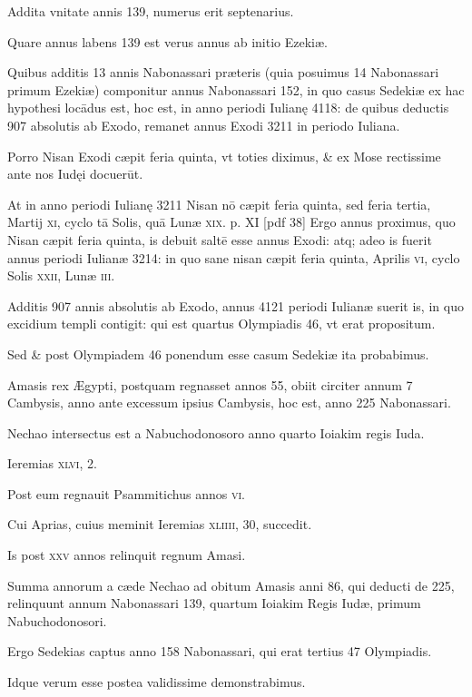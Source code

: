 \begin{parnumbers}
Addita vnitate annis 139, numerus erit septenarius. 

Quare annus labens 139 est verus annus ab initio Ezekiæ.

Quibus additis 13 annis Nabonassari præteris (quia posuimus 14 Nabonassari primum Ezekiæ) componitur annus Nabonassari 152, in quo casus Sedekiæ ex hac hypothesi locādus est, hoc est, in anno periodi Iulianę 4118: de quibus deductis 907 absolutis ab Exodo, remanet annus Exodi 3211 in periodo Iuliana.

Porro Nisan Exodi cæpit feria quinta, vt toties diximus, \& ex Mose rectissime ante nos Iudęi docuerūt.

At in anno periodi Iulianę 3211 Nisan nō cæpit feria quinta, sed feria tertia, Martij \textsc{xi}, cyclo tā Solis, quā Lunæ \textsc{xix}.
\clearpage
p. XI [pdf 38]
Ergo annus proximus, quo Nisan cæpit feria quinta, is debuit saltē esse annus Exodi: atq; adeo is fuerit annus periodi Iulianæ 3214: in quo sane nisan cæpit feria quinta, Aprilis \textsc{vi},
cyclo Solis \textsc{xxii}, Lunæ \textsc{iii}.

Additis 907 annis absolutis ab Exodo,
annus 4121 periodi Iulianæ suerit is, in quo excidium templi contigit:
qui est quartus Olympiadis 46, vt erat propositum.

Sed \& post
Olympiadem 46 ponendum esse casum Sedekiæ ita probabimus.

Amasis rex Ægypti, postquam regnasset annos 55, obiit circiter annum
7 Cambysis, anno ante excessum ipsius Cambysis, hoc est, anno
225  Nabonassari.

Nechao intersectus est a Nabuchodonosoro anno
quarto Ioiakim regis Iuda.

Ieremias \textsc{xlvi}, 2.

Post eum regnauit
Psammitichus annos \textsc{vi}.

Cui Aprias, cuius meminit Ieremias
\textsc{xliiii}, 30, succedit.

Is post \textsc{xxv} annos relinquit regnum Amasi.

Summa annorum a cæde Nechao ad obitum Amasis anni 86, qui
deducti de 225, relinquunt annum Nabonassari 139, quartum Ioiakim
Regis Iudæ, primum Nabuchodonosori.

Ergo Sedekias captus
anno 158 Nabonassari, qui erat tertius 47 Olympiadis.

Idque verum
esse postea validissime demonstrabimus.


\end{parnumbers}
